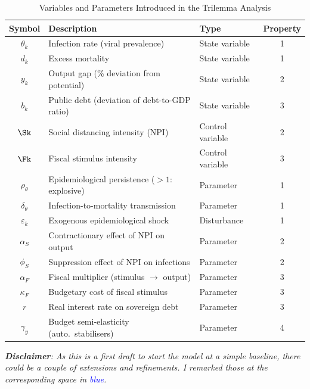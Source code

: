\begin{table}[ht]
\centering
\caption{Variables and Parameters Introduced in the Trilemma Analysis}
\label{tab:notation}
\renewcommand{\arraystretch}{1.25}
\small
\begin{tabular}{@{} c l l c @{}}
\toprule
\textbf{Symbol} & \textbf{Description} & \textbf{Type} & \textbf{Property} \\
\midrule
$\theta_k$ & Infection rate (viral prevalence) & State variable & 1 \\
$d_k$ & Excess mortality & State variable & 1 \\
$y_k$ & Output gap (\% deviation from potential) & State variable & 2 \\
$b_k$ & Public debt (deviation of debt-to-GDP ratio) & State variable & 3 \\
\midrule
$\Sk$ & Social distancing intensity (NPI) & Control variable & 2 \\
$\Fk$ & Fiscal stimulus intensity & Control variable & 3 \\
\midrule
$\rho_\theta$ & Epidemiological persistence ($>1$: explosive) & Parameter & 1 \\
$\delta_\theta$ & Infection-to-mortality transmission & Parameter & 1 \\
$\varepsilon_k$ & Exogenous epidemiological shock & Disturbance & 1 \\
$\alpha_S$ & Contractionary effect of NPI on output & Parameter & 2 \\
$\phi_S$ & Suppression effect of NPI on infections & Parameter & 2 \\
$\alpha_F$ & Fiscal multiplier (stimulus $\to$ output) & Parameter & 3 \\
$\kappa_F$ & Budgetary cost of fiscal stimulus & Parameter & 3 \\
$r$ & Real interest rate on sovereign debt & Parameter & 3 \\
$\gamma_y$ & Budget semi-elasticity (auto.\ stabilisers) & Parameter & 4 \\
\bottomrule
\end{tabular}
\end{table}





\vspace{2mm}

\noindent \textit{\textbf{Disclaimer}: As this is a first draft to start the model at a simple baseline, there could be a couple of extensions and refinements. I remarked those at the corresponding space in \textcolor{blue}{blue}.}

